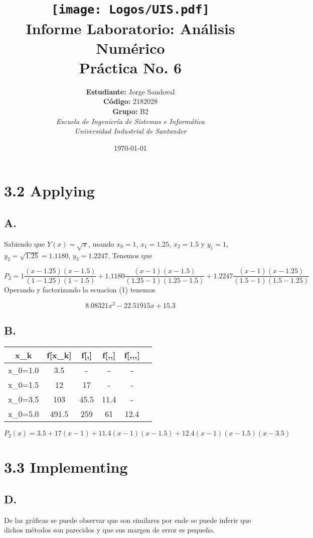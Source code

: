 \documentclass[spanish,notitlepage,letterpaper, 12pt]{article} %
\newcommand{\university}{\normalsize Universidad Industrial de Santander}
\newcommand{\faculty}{\normalsize  Escuela de Ingenier\'ia de Sistemas e Inform\'atica}
\newcommand{\codigo}{\normalsize  2182028}
\newcommand{\grupo}{\normalsize  B2}
\newcommand{\estudiante}{\normalsize  Jorge Sandoval}
\begin{document}
\title{	\vspace{-12mm}\texttt{[image: Logos/UIS.pdf]}\\Informe Laboratorio: An\'alisis Num\'erico\\  \centering Pr\'actica No. 6}
\author{
\textbf{Estudiante:} \estudiante\\ \textbf{C\'odigo:} \codigo\\
\textbf{Grupo:} \grupo\\
\textit{\faculty}\\
\textit{\university}}
\date{\today}
\maketitle

\section*{3.2 Applying}

\subsection*{A.} Sabiendo que $Y(x)=\sqrt{x}$, usando $x_0=1$, $x_1=1.25$, $x_2=1.5$ y $y_1=1$, $y_2=\sqrt{1.25}=1.1180$, $y_3=1.2247$. Tenemos que 

\begin{equation}
    P_2=1\frac{(x-1.25)(x-1.5)}{(1-1.25)(1-1.5)}+1.1180\frac{(x-1)(x-1.5)}{(1.25-1)(1.25-1.5)}+1.2247\frac{(x-1)(x-1.25)}{(1.5-1)(1.5-1.25)}
\end{equation}
Operando y factorizando la ecuacion (1) tenemos

\begin{equation}
    8.08321x^2-22.51915x+15.3
\end{equation}
\subsection*{B.}

\begin{center}
\begin{tabular}{|c|c|c|c|c|c|} 
\hline
x_k & f[x_k] & f[,]& f[,,]& f[,,,] \\
\hline
x_0=1.0 & 3.5 & - & - & - \\ 
x_0=1.5 & 12 & 17 & - & - \\ 
x_0=3.5 & 103 & 45.5 & 11.4 & - \\ 
x_0=5.0 & 491.5 & 259 & 61 & 12.4 \\ 
\hline
\end{tabular}
\end{center}
$P_2(x)=3.5+17(x-1)+11.4(x-1)(x-1.5)+12.4(x-1)(x-1.5)(x-3.5)$
\section*{3.3 Implementing}
\subsection*{D.} 

De las gráficas se puede observar que son similares por ende se puede inferir que dichos métodos son parecidos y que sus margen de error es pequeño.
\end{document}
